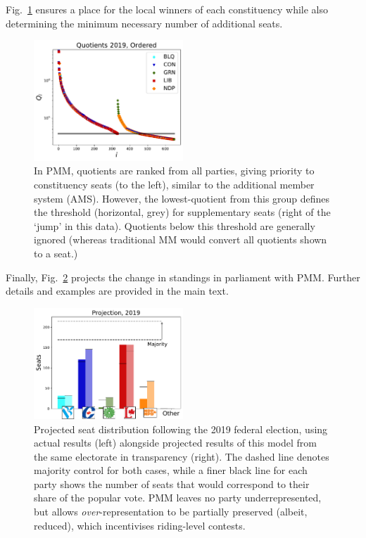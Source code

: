 Fig.~\ref{fig:sum_Qlist_ordered_2019} ensures a place for the local winners of each constituency while also determining the minimum necessary number of additional seats.
\begin{figure}
\includegraphics[width=0.50\textwidth,clip]{PR_calcs/data/raw_2019/PMM_out/PMM_Qlist_all.pdf}
\caption{ In PMM, quotients are ranked from all parties, giving priority to constituency seats (to the left), similar to the additional member system (AMS). However, the lowest-quotient from this group defines the threshold (horizontal, grey) for supplementary seats (right of the `jump' in this data). Quotients below this threshold are generally ignored (whereas traditional MM would convert all quotients shown to a seat.)}
\label{fig:sum_Qlist_ordered_2019}
\end{figure}
Finally, Fig.~\ref{fig:sum_projection_2019} projects the change in standings in parliament with PMM. Further details and examples are provided in the main text.

\begin{figure}
  \includegraphics[width=0.50\textwidth,clip]{PR_calcs/data/raw_2019/PMM_out/PMM_projections.pdf}
  \caption{Projected seat distribution following the 2019 federal election, using actual results (left) alongside projected results of this model from the same electorate in transparency (right). The dashed line denotes majority control for both cases, while a finer black line for each party shows the number of seats that would correspond to their share of the popular vote. PMM leaves no party underrepresented, but allows \emph{over}-representation to be partially preserved (albeit, reduced), which incentivises riding-level contests.}
\label{fig:sum_projection_2019}
\end{figure}
